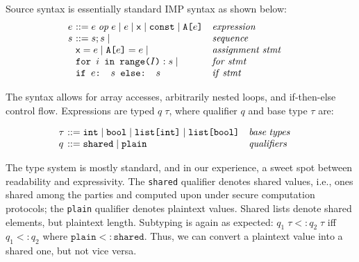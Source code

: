 Source syntax is essentially standard IMP syntax as shown below:
{\small
\[
\begin{array}{l@{~~~~~}l}
  \begin{array}{l@{~}l@{~~~}l}
 e & ::= e \; \mathit{op} \; e \mid e \mid \x \mid  \texttt{const} \mid \texttt{A[$e$]} & \mathit{expression} \\
  s & ::= s;s \mid  & \mathit{sequence} \\
  & \x = e \mid \texttt{A[$e$]} = e \mid & \mathit{assignment \; stmt} \\
  & \texttt{for $i$ in range($I$)}: s \mid & \mathit{for \; stmt} \\
  & \texttt{if $e$: $s$ else: $s$} & \mathit{if \; stmt} \\

  \end{array}
\end{array}
\]
}

The syntax allows for array accesses, arbitrarily nested loops, and if-then-else control flow.
Expressions are typed $q \; \tau$, where qualifier $q$ and base type $\tau$ are:

{\small
\[
\begin{array}{l@{~~~~~}l}
  \begin{array}{l@{~}l@{~~~}l}
 \tau & ::= \texttt{int}  \mid \texttt{bool} \mid \texttt{list[int]} \mid  \texttt{list[bool]} & \mathit{base \; types} \\
  q & ::= \texttt{shared} \mid \texttt{plain} & \mathit{qualifiers} \\
  \end{array}
\end{array}
\]
}

The type system is mostly standard, and in our experience, a sweet spot between readability and expressivity.
The \texttt{shared} qualifier denotes shared values, i.e., ones shared among the parties and computed upon
under secure computation protocols; the \texttt{plain} qualifier denotes plaintext values. Shared lists denote
shared elements, but plaintext length. Subtyping is again as expected: $q_1 \; \tau <: q_2 \; \tau$
iff $q_1 <: q_2$ where $\texttt{plain} <: \texttt{shared}$. Thus, we can convert a plaintext value into a shared one,
but not vice versa.

